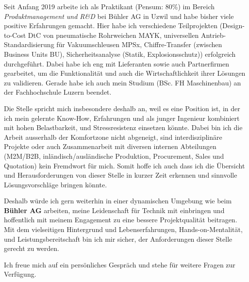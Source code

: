 \documentclass[11pt, a4paper]{awesome-cv}
\newcommand{\companyName}{Bühler AG}
\begin{document}
\makecvheader

\makelettertitle

\begin{cvletter}
	
Seit Anfang 2019 arbeite ich als Praktikant (Pensum: 80\%) im Bereich \textit{Produktmanagement und R\&D} bei Bühler AG in Uzwil und habe bisher viele positive Erfahrungen gemacht. Hier habe ich verschiedene Teilprojekten (Design-to-Cost DtC von pneumatische Rohrweichen MAYK, universellen Antrieb-Standardisierung für Vakuumschleusen MPSx, Chiffre-Transfer (zwischen Business Units BU), Sicherheitsanalyse (Statik, Explosionsschutz)) erfolgreich durchgeführt. Dabei habe ich eng mit Lieferanten sowie auch Partnerfirmen gearbeitet, um die Funktionalität und auch die Wirtschaftlichkeit ihrer Lösungen zu validieren. Gerade habe ich auch mein Studium (BSc. FH Maschinenbau) an der Fachhochschule Luzern beendet.

Die Stelle spricht mich insbesondere deshalb an, weil es eine Position ist, in der ich mein gelernte Know-How, Erfahrungen und als junger Ingenieur kombiniert mit hohen Belastbarkeit, und Stressresistenz einsetzen könnte. Dabei bin ich die Arbeit ausserhalb der Komfortzone nicht abgeneigt, sind interdisziplinäre Projekte oder auch Zusammenarbeit mit diversen internen Abteilungen (M2M/B2B, inländisch/ausländische Produktion, Procurement, Sales und Quotation) kein Fremdwort für mich. Somit hoffe ich auch dass ich die Übersicht und Herausforderungen von dieser Stelle in kurzer Zeit erkennen und sinnvolle Lösungsvorschläge bringen könnte.  

Deshalb würde ich gern weiterhin in einer dynamischen Umgebung wie beim \textbf{\companyName} arbeiten, meine Leidenschaft für Technik mit einbringen und hoffentlich mit meinem Engagement zu eine bessere Projektqualität beitragen. Mit dem vielseitigen Hintergrund und Lebenserfahrungen, Hands-on-Mentalität, und Leistungsbereitschaft bin ich mir sicher, der Anforderungen dieser Stelle gerecht zu werden. 

Ich freue mich auf ein persönliches Gespräch und stehe für weitere Fragen zur Verfügung.

\end{cvletter}

\makeletterclosing
\end{document}
